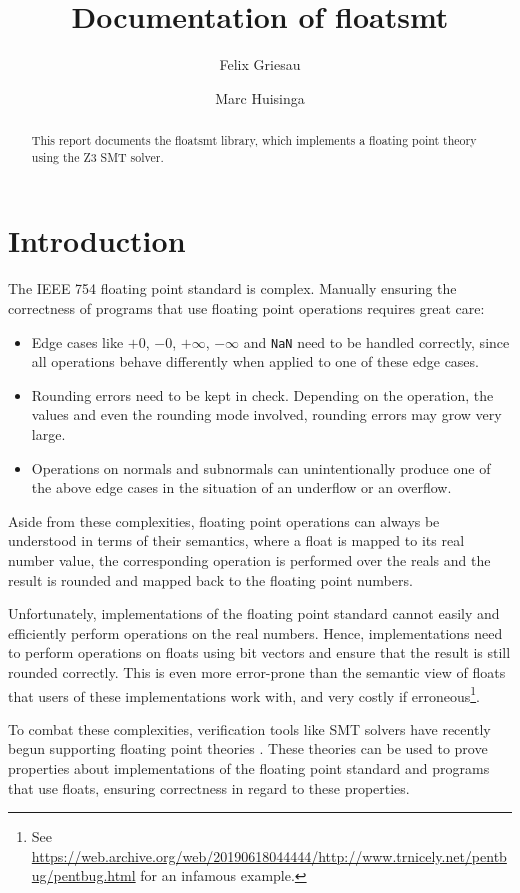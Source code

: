 \documentclass[a4paper,UKenglish,cleveref, autoref, thm-restate]{lipics-v2019}
\title{Documentation of floatsmt}
\author{Felix Griesau}{Karlsruhe Institute of Technology, Germany}{felix.griesau@student.kit.edu}{}{}
\author{Marc Huisinga}{Karlsruhe Institute of Technology, Germany}{mhuisi@protonmail.com}{}{}
\begin{document}
\maketitle

\begin{abstract}
This report documents the floatsmt library, which implements a floating point theory using the Z3 SMT solver. 
\end{abstract}


\section{Introduction}
The IEEE 754 floating point standard \cite{ieee} is complex. Manually ensuring the correctness of programs that use floating point operations requires great care: 
\begin{itemize}
\item Edge cases like $+0$, $-0$, $+\infty$, $-\infty$ and \verb|NaN| need to be handled correctly, since all operations behave differently when applied to one of these edge cases.
\item Rounding errors need to be kept in check. Depending on the operation, the values and even the rounding mode involved, rounding errors may grow very large.
\item Operations on normals and subnormals can unintentionally produce one of the above edge cases in the situation of an underflow or an overflow.
\end{itemize}
Aside from these complexities, floating point operations can always be understood in terms of their semantics, where a float is mapped to its real number value, the corresponding operation is performed over the reals and the result is rounded and mapped back to the floating point numbers.

Unfortunately, implementations of the floating point standard cannot easily and efficiently perform operations on the real numbers. Hence, implementations need to perform operations on floats using bit vectors and ensure that the result is still rounded correctly. This is even more error-prone than the semantic view of floats that users of these implementations work with, and very costly if erroneous\footnote{See \url{https://web.archive.org/web/20190618044444/http://www.trnicely.net/pentbug/pentbug.html} for an infamous example.}. 

To combat these complexities, verification tools like SMT solvers have recently begun supporting floating point theories \cite{semantics}. These theories can be used to prove properties about implementations of the floating point standard and programs that use floats, ensuring correctness in regard to these properties.
\end{document}
